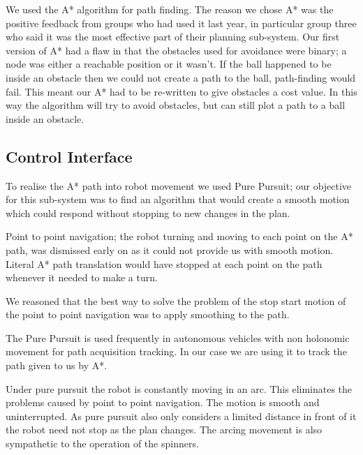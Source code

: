 
We used the A* algorithm for path finding.  The reason we chose A* was the
positive feedback from groups who had used it last year, in particular group
three who said it was the most effective part of their planning sub-system.
Our first version of A* had a flaw in that the obstacles used for avoidance
were binary; a node was either a reachable position or it wasn't. 
If the ball happened to be inside an obstacle then we could not create a path
to the ball, path-finding would fail. This meant our A* had to be re-written to
give obstacles a cost value. In this way the algorithm will try to
avoid obstacles, but can still plot a path to a ball inside an obstacle.

\subsection{Control Interface}

To realise the A* path into robot movement we used Pure Pursuit;
our objective for this sub-system was to find an algorithm that
would create a smooth motion which could respond without stopping to
new changes in the plan.

Point to point navigation; the robot turning and moving to each point on the A*
path, was dismissed early on as it could not provide us with smooth motion.
Literal A* path translation would have stopped at each point on the path
whenever it needed to make a turn.


We reasoned that the best way to solve the problem of the stop start motion of
the point to point navigation was to apply smoothing to the path. 

The Pure Pursuit is used frequently in autonomous vehicles with non holonomic
movement for path acquisition tracking\cite{agvpp}\cite{coulterpp}. In our case
we are using it to track the path given to us by A*.

Under pure pursuit the robot is constantly moving in an arc. This
eliminates the problems caused by point to point navigation. The motion is
smooth and uninterrupted. As pure pursuit also only considers a limited distance
in front of it the robot need not stop as the plan changes. The arcing movement
is also sympathetic to the operation of the spinners.

